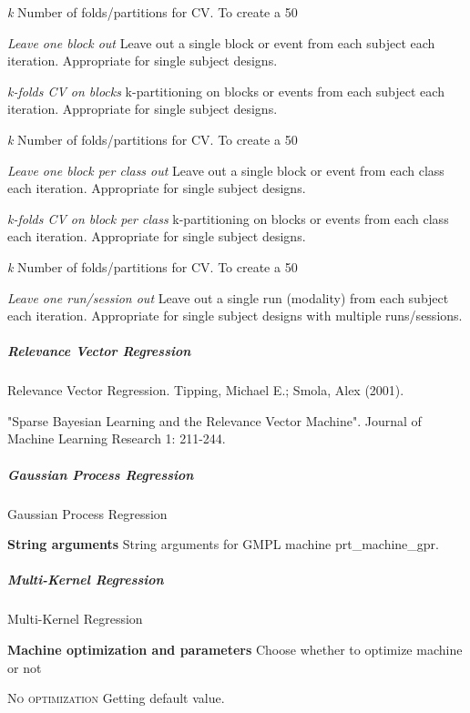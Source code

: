 \textit{k}
Number of folds/partitions for CV. To create a 50%


\textit{Leave one block out}
Leave out a single block or event from each subject each iteration. Appropriate for single subject designs.


\textit{k-folds CV on blocks}
k-partitioning on blocks or events from each subject each iteration. Appropriate for single subject designs.


\textit{k}
Number of folds/partitions for CV. To create a 50%


\textit{Leave one block per class out}
Leave out a single block or event from each class each iteration. Appropriate for single subject designs.


\textit{k-folds CV on block per class}
k-partitioning on blocks or events from each class each iteration. Appropriate for single subject designs.


\textit{k}
Number of folds/partitions for CV. To create a 50%


\textit{Leave one run/session out}
Leave out a single run (modality) from each subject each iteration. Appropriate for single subject designs with multiple runs/sessions.


\subparagraph{Relevance Vector Regression}
Relevance Vector Regression. Tipping, Michael E.; Smola, Alex (2001).

"Sparse Bayesian Learning and the Relevance Vector Machine". Journal of Machine Learning Research 1: 211-244.


\subparagraph{Gaussian Process Regression}
Gaussian Process Regression


\textbf{String arguments}
String arguments for GMPL machine prt\_machine\_gpr.


\subparagraph{Multi-Kernel Regression}
Multi-Kernel Regression


\textbf{Machine optimization and parameters}
Choose whether to optimize machine or not


\textsc{No optimization}
Getting default value.


